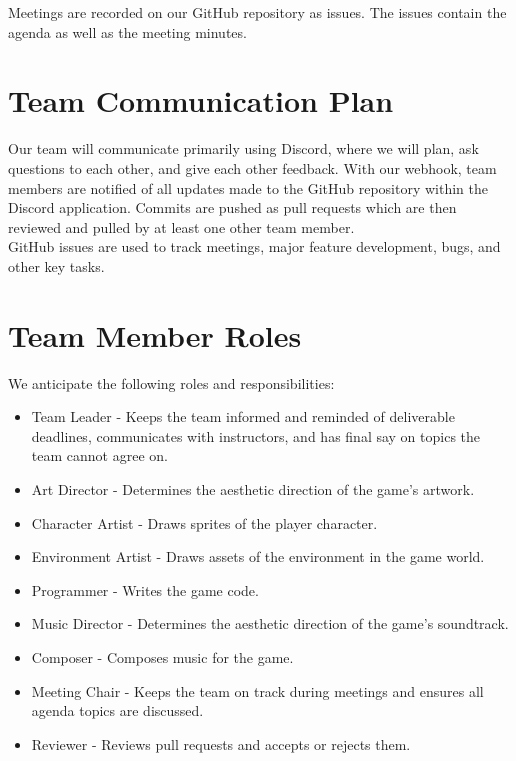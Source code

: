 \documentclass{article}
\begin{document}
Meetings are recorded on our GitHub repository as issues. The issues contain the agenda as well as the meeting minutes.\\


\section{Team Communication Plan}

Our team will communicate primarily using Discord, where we will plan, ask questions to each other, and give each other feedback. With our webhook, team members are notified of all updates made to the GitHub repository within the Discord application. Commits are pushed as pull requests which are then reviewed and pulled by at least one other team member.\\

GitHub issues are used to track meetings, major feature development, bugs, and other key tasks.\\


\section{Team Member Roles}

We anticipate the following roles and responsibilities:
\begin{itemize}
\item{Team Leader - Keeps the team informed and reminded of deliverable deadlines, communicates with instructors, and has final say on topics the team cannot agree on.}
\item{Art Director - Determines the aesthetic direction of the game’s artwork.}
\item{Character Artist - Draws sprites of the player character.}
\item{Environment Artist - Draws assets of the environment in the game world.}
\item{Programmer - Writes the game code.}
\item{Music Director - Determines the aesthetic direction of the game’s soundtrack.}
\item{Composer - Composes music for the game.}
\item{Meeting Chair - Keeps the team on track during meetings and ensures all agenda topics are discussed.}
\item{Reviewer - Reviews pull requests and accepts or rejects them.}
\end{itemize}
\end{document}
